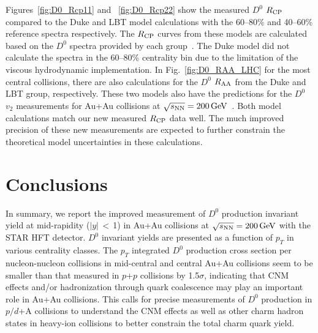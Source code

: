 \documentclass[%
 reprint,	
 amsmath,amssymb,
 aps,
 prc,
]{revtex4-1}
\begin{document}
Figures~\ref{fig:D0_Rcp11} and ~\ref{fig:D0_Rcp22} show the measured $D^0$ $R_{\rm CP}$ compared to the Duke and LBT model calculations with the 60--80\% and 40--60\% reference spectra respectively. The $R_{\rm CP}$ curves from these models are calculated based on the $D^0$ spectra provided by each group~\cite{Cao:2016gvr,LBT:private,Xu:2017obm}. The Duke model did not calculate the spectra in the 60--80\% centrality bin due to the limitation of the viscous hydrodynamic implementation. In Fig.~\ref{fig:D0_RAA_LHC} for the most central collisions, there are also calculations for the $D^0$ $R_{\rm AA}$ from the Duke and LBT group, respectively. These two models also have the predictions for the $D^0$ $v_2$ measurements for Au+Au collisions at ${\sqrt{s_{\rm NN}} = \rm{200\,GeV}}$~\cite{Star_D_v2}. %
Both model calculations match our new measured $R_{\rm CP}$ data well. The much improved precision of these new measurements are expected to further constrain the theoretical model uncertainties in these calculations.


\section{Conclusions}
\label{summary}

In summary, we report the improved measurement of $D^0$ production invariant yield at mid-rapidity ($|y|$\,$<$\,1) in Au+Au collisions at ${\sqrt{s_{\rm NN}} = \rm{200\,GeV}}$ with the STAR HFT detector. $D^0$ invariant yields are presented as a function of $p_{T}$ in various centrality classes. The $p_{T}$ integrated $D^0$ production cross section per nucleon-nucleon collisions in mid-central and central Au+Au collisions seem to be smaller than that measured in $p$+$p$ collisions by 1.5$\sigma$, indicating that CNM effects and/or hadronization through quark coalescence may play an important role in Au+Au collisions. This calls for precise measurements of $D^0$ production in $p/d$+A collisions to understand the CNM effects as well as other charm hadron states in heavy-ion collisions to better constrain the total charm quark yield. 
\end{document}
